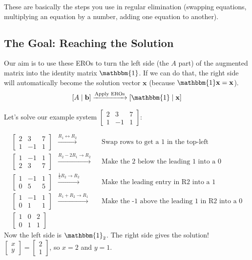 \documentclass[11pt]{article}
\newcommand{\x}{\mathbf{x}}
\newcommand{\bb}{\mathbf{b}}
\newcommand{\id}{\mathbbm{1}}
\begin{document}
These are basically the steps you use in regular elimination (swapping equations, multiplying an equation by a number, adding one equation to another).

\subsection{The Goal: Reaching the Solution}

Our aim is to use these EROs to turn the left side (the $A$ part) of the augmented matrix into the identity matrix $\id$. If we can do that, the right side will automatically become the solution vector $\x$ (because $\id \x = \x$).
\[ [A \mid \bb] \xrightarrow{\text{Apply EROs}} [\id \mid \x] \]

Let's solve our example system $\left[ \begin{array}{cc|c} 2 & 3 & 7 \\ 1 & -1 & 1 \end{array} \right]$:

\begin{example}[Solving $A\x=\bb$]
\begin{align*}
\left[ \begin{array}{cc|c} 2 & 3 & 7 \\ 1 & -1 & 1 \end{array} \right]
&\xrightarrow{R_1 \leftrightarrow R_2} && \text{Swap rows to get a 1 in the top-left} \\
\left[ \begin{array}{cc|c} 1 & -1 & 1 \\ 2 & 3 & 7 \end{array} \right]
&\xrightarrow{R_2 - 2R_1 \to R_2} && \text{Make the 2 below the leading 1 into a 0} \\
\left[ \begin{array}{cc|c} 1 & -1 & 1 \\ 0 & 5 & 5 \end{array} \right]
&\xrightarrow{\frac{1}{5} R_2 \to R_2} && \text{Make the leading entry in R2 into a 1} \\
\left[ \begin{array}{cc|c} 1 & -1 & 1 \\ 0 & 1 & 1 \end{array} \right]
&\xrightarrow{R_1 + R_2 \to R_1} && \text{Make the -1 above the leading 1 in R2 into a 0} \\
\left[ \begin{array}{cc|c} 1 & 0 & 2 \\ 0 & 1 & 1 \end{array} \right]
\end{align*}
Now the left side is $\id_2$. The right side gives the solution! $\begin{bmatrix} x \\ y \end{bmatrix} = \begin{bmatrix} 2 \\ 1 \end{bmatrix}$, so $x=2$ and $y=1$.
\end{example}
\end{document}
